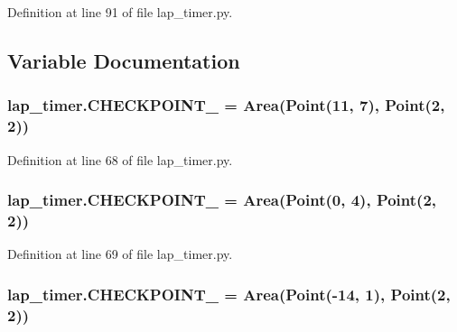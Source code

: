 Definition at line 91 of file lap\+\_\+timer.\+py.



\subsection{Variable Documentation}
\subsubsection[{\texorpdfstring{C\+H\+E\+C\+K\+P\+O\+I\+N\+T\+\_\+1}{CHECKPOINT_1}}]{\setlength{\rightskip}{0pt plus 5cm}lap\+\_\+timer.\+C\+H\+E\+C\+K\+P\+O\+I\+N\+T\+\_ = {\bf Area}({\bf Point}(11, 7), {\bf Point}(2, 2))}\hypertarget{namespacelap__timer_a7d4aff4d1c24ecd19c02265c9dfa0a6f}{}\label{namespacelap__timer_a7d4aff4d1c24ecd19c02265c9dfa0a6f}


Definition at line 68 of file lap\+\_\+timer.\+py.

\subsubsection[{\texorpdfstring{C\+H\+E\+C\+K\+P\+O\+I\+N\+T\+\_\+2}{CHECKPOINT_2}}]{\setlength{\rightskip}{0pt plus 5cm}lap\+\_\+timer.\+C\+H\+E\+C\+K\+P\+O\+I\+N\+T\+\_ = {\bf Area}({\bf Point}(0, 4), {\bf Point}(2, 2))}\hypertarget{namespacelap__timer_a33e41bd5d29fc940e87ee99b1aea26cd}{}\label{namespacelap__timer_a33e41bd5d29fc940e87ee99b1aea26cd}


Definition at line 69 of file lap\+\_\+timer.\+py.

\subsubsection[{\texorpdfstring{C\+H\+E\+C\+K\+P\+O\+I\+N\+T\+\_\+3}{CHECKPOINT_3}}]{\setlength{\rightskip}{0pt plus 5cm}lap\+\_\+timer.\+C\+H\+E\+C\+K\+P\+O\+I\+N\+T\+\_ = {\bf Area}({\bf Point}(-\/14, 1), {\bf Point}(2, 2))}\hypertarget{namespacelap__timer_afbd7eeced4ee639b3f423fe8a2958410}{}\label{namespacelap__timer_afbd7eeced4ee639b3f423fe8a2958410}


